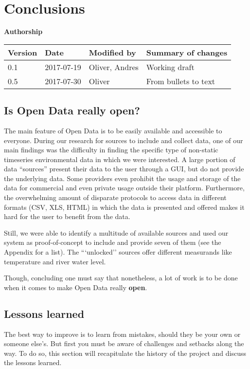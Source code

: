 \section{Conclusions}\label{sec:conclusions}

\textbf{Authorship}

\begin{longtable}{@{}llll@{}}
\toprule
Version & Date & Modified by & Summary of changes\tabularnewline
\midrule
\endhead
0.1 & 2017-07-19 & Oliver, Andres & Working draft\tabularnewline
0.5 & 2017-07-30 & Oliver & From bullets to text\tabularnewline
\bottomrule
\end{longtable}

\subsection{Is Open Data really open?}\label{is-open-data-really-open}

The main feature of Open Data is to be easily available and accessible to everyone.
During our research for sources to include and collect data, one of our main findings
was the difficulty in finding the specific type of non-static timeseries
environmental data in which we were interested. A large portion of data ``sources''
present their data to the user through a GUI, but do not provide the underlying data.
Some providers even prohibit the usage and storage of the data for commercial
and even private usage outside their platform. Furthermore, the overwhelming
amount of disparate protocols to access data in different formats (CSV, XLS, HTML)
in which the data is presented and offered makes it hard for the user to benefit
from the data.

Still, we were able to identify a multitude of available sources and used our
system as proof-of-concept to include and provide seven of them (see the Appendix for a list).
The ```unlocked'' sources offer different measurands like temperature and river water level.

Though, concluding one must say that nonetheless, a lot of work is to be done
when it comes to make Open Data really \textbf{open}.

\subsection{Lessons learned}\label{lessons-learned}

The best way to improve is to learn from mistakes, should they be your own or
someone else's. But first you must be aware of challenges and setbacks along the
way. To do so, this section will recapitulate the history of the project and
discuss the lessons learned.


